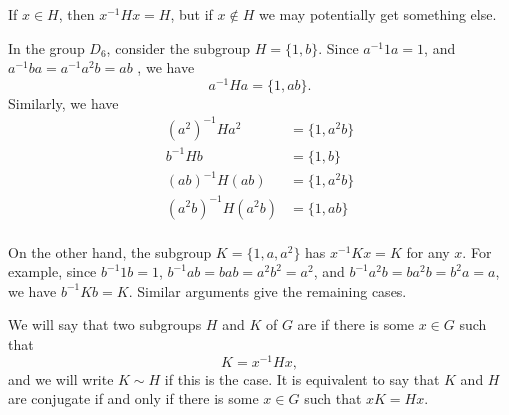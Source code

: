 If $x \in H$, then $x^{-1}Hx = H$, but if $x \notin H$ we may potentially
get something else.

\begin{example}
  In the group $D_{6}$, consider the subgroup $H = \{1, b\}$.  Since
  $a^{-1}1a = 1$, and $a^{-1}ba = a^{-1}a^{2}b = ab$ , we have
  \[
    a^{-1}Ha = \{1, ab\}.
  \]
  Similarly, we have
  \begin{align*}
    (a^{2})^{-1}Ha^{2} &= \{1, a^{2}b\} \\
    b^{-1}Hb &= \{1, b\} \\
    (ab)^{-1}H(ab) &= \{1, a^{2}b\} \\
    (a^{2}b)^{-1}H(a^{2}b) &= \{1, ab\} \\
  \end{align*}
  
  On the other hand, the subgroup $K = \{1, a, a^{2}\}$ has $x^{-1}Kx = K$
  for any $x$.  For example, since $b^{-1}1b = 1$, $b^{-1}ab = bab =
  a^{2}b^{2} = a^{2}$, and $b^{-1}a^{2}b = ba^{2}b = b^{2}a = a$, we have
  $b^{-1}Kb = K$.  Similar arguments give the remaining cases.
\end{example}

We will say that two subgroups $H$ and $K$ of $G$ are
 if there is some $x \in G$ such that
\[
  K = x^{-1}Hx,
\]
and we will write $K \sim H$ if this is the case.  It is equivalent to
say that $K$ and $H$ are conjugate if and only if there is some $x \in G$
such that $xK = Hx$.

